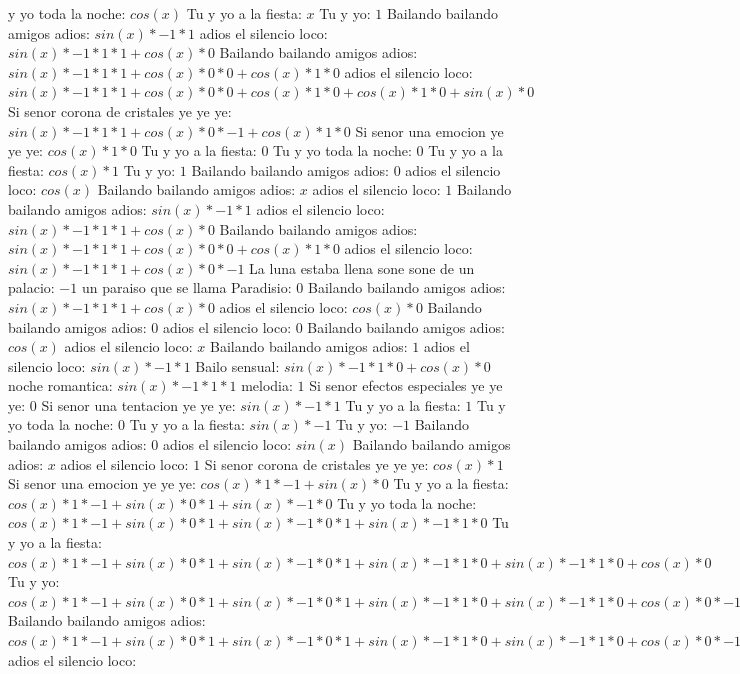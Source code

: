 \documentclass{article}
\begin{document}
y yo toda la noche: $cos(x)$  \newline Tu y yo a la fiesta: $x$ Tu y yo: $1$  \newline Bailando bailando amigos adios: $sin(x)*-1*1$ adios el silencio loco: $sin(x)*-1*1*1+cos(x)*0$ Bailando bailando amigos adios: ${sin(x)*-1*1*1+cos(x)*0}*0+cos(x)*1*0$ adios el silencio loco: ${sin(x)*-1*1*1+cos(x)*0}*0+cos(x)*1*0+cos(x)*1*0+sin(x)*0$ Si senor corona de cristales ye ye ye: ${sin(x)*-1*1*1+cos(x)*0}*-1+cos(x)*1*0$  \newline Si senor una emocion ye ye ye: $cos(x)*1*0$ Tu y yo a la fiesta: $0$ Tu y yo toda la noche: $0$  \newline Tu y yo a la fiesta: $cos(x)*1$ Tu y yo: $1$ Bailando bailando amigos adios: $0$  \newline adios el silencio loco: $cos(x)$  \newline Bailando bailando amigos adios: $x$ adios el silencio loco: $1$  \newline Bailando bailando amigos adios: $sin(x)*-1*1$ adios el silencio loco: $sin(x)*-1*1*1+cos(x)*0$ Bailando bailando amigos adios: ${sin(x)*-1*1*1+cos(x)*0}*0+cos(x)*1*0$ adios el silencio loco: ${sin(x)*-1*1*1+cos(x)*0}*-1$ La luna estaba llena sone sone de un palacio: $-1$ un paraiso que se llama Paradisio: $0$  \newline Bailando bailando amigos adios: $sin(x)*-1*1*1+cos(x)*0$  \newline adios el silencio loco: $cos(x)*0$ Bailando bailando amigos adios: $0$ adios el silencio loco: $0$  \newline Bailando bailando amigos adios: $cos(x)$  \newline adios el silencio loco: $x$ Bailando bailando amigos adios: $1$  \newline adios el silencio loco: $sin(x)*-1*1$ Bailo sensual: $sin(x)*-1*1*0+cos(x)*0$ noche romantica: $sin(x)*-1*1*1$ melodia: $1$ Si senor efectos especiales ye ye ye: $0$  \newline Si senor una tentacion ye ye ye: $sin(x)*-1*1$ Tu y yo a la fiesta: $1$ Tu y yo toda la noche: $0$  \newline Tu y yo a la fiesta: $sin(x)*-1$ Tu y yo: $-1$ Bailando bailando amigos adios: $0$  \newline adios el silencio loco: $sin(x)$  \newline Bailando bailando amigos adios: $x$ adios el silencio loco: $1$  \newline Si senor corona de cristales ye ye ye: $cos(x)*1$ Si senor una emocion ye ye ye: $cos(x)*1*-1+sin(x)*0$ Tu y yo a la fiesta: ${cos(x)*1*-1+sin(x)*0}*1+sin(x)*-1*0$ Tu y yo toda la noche: ${{cos(x)*1*-1+sin(x)*0}*1+sin(x)*-1*0}*1+sin(x)*-1*1*0$ Tu y yo a la fiesta: ${{cos(x)*1*-1+sin(x)*0}*1+sin(x)*-1*0}*1+sin(x)*-1*1*0+sin(x)*-1*1*0+cos(x)*0$ Tu y yo: ${{{cos(x)*1*-1+sin(x)*0}*1+sin(x)*-1*0}*1+sin(x)*-1*1*0+sin(x)*-1*1*0+cos(x)*0}*-1+{sin(x)*-1*1*1+cos(x)*0}*0$ Bailando bailando amigos adios: ${{{cos(x)*1*-1+sin(x)*0}*1+sin(x)*-1*0}*1+sin(x)*-1*1*0+sin(x)*-1*1*0+cos(x)*0}*-1+{sin(x)*-1*1*1+cos(x)*0}*0+{sin(x)*-1*1*1+cos(x)*0}*0+cos(x)*1*0$ adios el silencio loco: 
\end{document}
